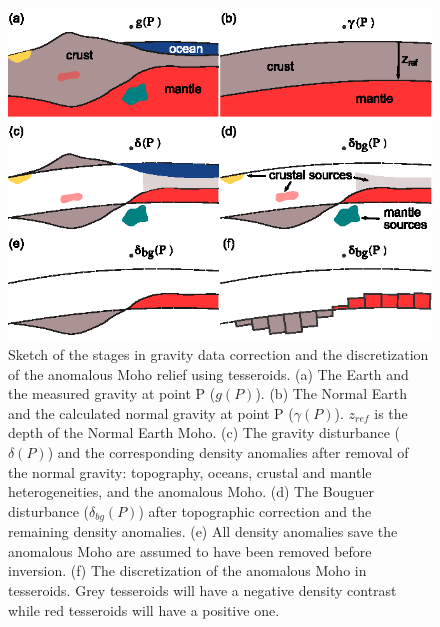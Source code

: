\documentclass[extra,mreferee]{gji}
\begin{document}
\begin{figure}
    \centering
    \includegraphics{figures/problem-concept}
    \caption{
        Sketch of the stages in gravity data correction and
        the discretization of the anomalous Moho relief using tesseroids.
        (a) The Earth and the measured gravity at point P ($g(P)$).
        (b) The Normal Earth and the calculated normal gravity at point P
        ($\gamma(P)$). $z_{ref}$ is the depth of the Normal Earth Moho.
        (c) The gravity disturbance ($\delta(P)$) and the corresponding density
        anomalies after removal of the normal gravity: topography, oceans,
        crustal and mantle heterogeneities, and the anomalous Moho.
        (d) The Bouguer disturbance ($\delta_{bg}(P)$) after topographic
        correction and the remaining density anomalies.
        (e) All density anomalies save the anomalous Moho are assumed to have
        been removed before inversion.
        (f) The discretization of the anomalous Moho in tesseroids. Grey
        tesseroids will have a negative density contrast while red tesseroids
        will have a positive one.
    }
    \label{fig:anomalysketch}
\end{figure}
\end{document}
